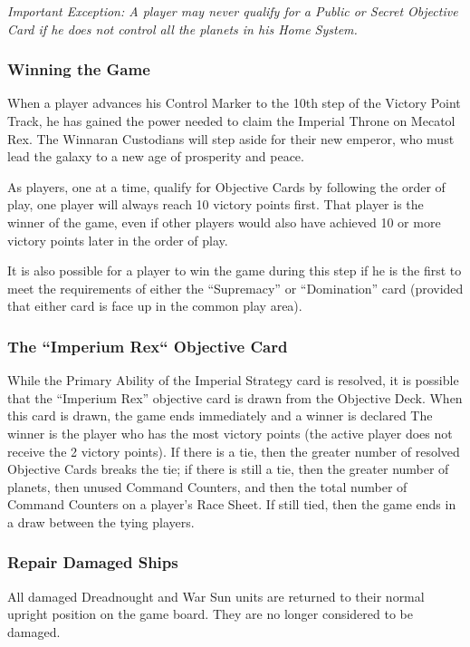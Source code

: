\documentclass[11pt,fleqn]{book} %
\begin{document}
\emph{Important Exception: A player may never qualify for a Public or Secret Objective Card if he does not control all the planets in his Home System.}

\subsubsection{Winning the Game}
When a player advances his Control Marker to the 10th step of the Victory Point Track, he has gained the power needed to claim the Imperial Throne on Mecatol Rex. The Winnaran Custodians will step aside for their new emperor, who must lead the galaxy to a new age of prosperity and peace.

As players, one at a time, qualify for Objective Cards by following the order of play, one player will always reach 10 victory points first. That player is the winner of the game, even if other players would also have achieved 10 or more victory points later in the order of play.

It is also possible for a player to win the game during this step if he is the first to meet the requirements of either the “Supremacy” or “Domination” card (provided that either card is face up in the common play area).

\begin{FFGbox}
\subsubsection{The “Imperium Rex“ Objective Card}
While the Primary Ability of the Imperial Strategy card is resolved, it is possible that the “Imperium Rex” objective card is drawn from the Objective Deck. When this card is drawn, the game ends immediately and a winner is declared The winner is the player who has the most victory points (the active player does not receive the 2 victory points). If there is a tie, then the greater number of resolved Objective Cards breaks the tie; if there is still a tie, then the greater number of planets, then unused Command Counters, and then the total number of Command Counters on a player's Race Sheet. If still tied, then the game ends in a draw between the tying players.
\end{FFGbox}

\subsubsection{Repair Damaged Ships}
All damaged Dreadnought and War Sun units are returned to their normal upright position on the game board. They are no longer considered to be damaged.
\end{document}
